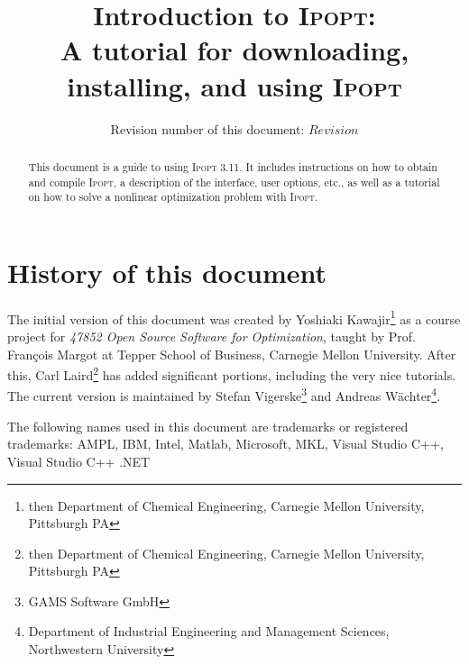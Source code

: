 \documentclass[10pt]{article}
\newcommand{\Ipopt}{\textsc{Ipopt}\xspace}
\begin{document}
\title{Introduction to \Ipopt:\\
A tutorial for downloading, installing, and using \Ipopt}

\author{Revision number of this document: $Revision$}

\maketitle

\begin{abstract}
  This document is a guide to using \Ipopt 3.11.  It includes
  instructions on how to obtain and compile \Ipopt, a description of
  the interface, user options, etc., as well as a tutorial on how to
  solve a nonlinear optimization problem with \Ipopt.
\end{abstract}

\section*{History of this document}
The initial version of this document was created by Yoshiaki
Kawajir\footnote{then Department of Chemical Engineering, Carnegie Mellon
  University, Pittsburgh PA} as a course project for \textit{47852
  Open Source Software for Optimization}, taught by Prof. Fran\c{c}ois
Margot at Tepper School of Business, Carnegie Mellon University.
After this, Carl Laird\footnote{then Department of Chemical
  Engineering, Carnegie Mellon University, Pittsburgh PA} has added
significant portions, including the very nice tutorials.  The current
version is maintained by Stefan Vigerske\footnote{GAMS Software GmbH} and
  Andreas W\"achter\footnote{Department of Industrial Engineering and
  Management Sciences, Northwestern University}.

\tableofcontents

\vspace{\baselineskip}
\begin{small}
\noindent
The following names used in this document are trademarks or registered
trademarks: AMPL, IBM, Intel, Matlab, Microsoft, MKL, Visual Studio C++,
Visual Studio C++ .NET
\end{small}
\end{document}
